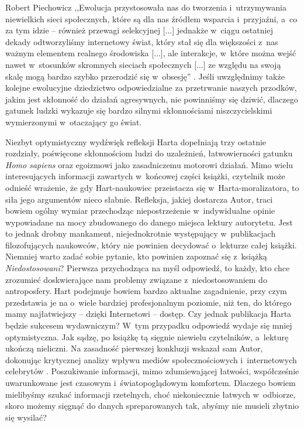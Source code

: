 \begin{newrevplenv}{Robert Piechowicz}
,,Ewolucja przystosowała nas do tworzenia i~utrzymywania niewielkich sieci społecznych, które są dla nas źródłem wsparcia i~przyjaźni, a~co za tym idzie -- również przewagi selekcyjnej [...] jednakże w~ciągu ostatniej dekady odtworzyliśmy internetowy świat, który stał się dla większości z~nas ważnym elementem realnego środowiska [...], ale interakcje, w~które można wejść nawet w~stosunków skromnych sieciach społecznych [...] ze względu na swoją skalę mogą bardzo szybko przerodzić się w~obsesję''
\parencite[][s.~204n]{hart_niedostosowani_2021}. %
 Jeśli uwzględnimy także kolejne ewolucyjne dziedzictwo odpowiedzialne za przetrwanie naszych przodków, jakim jest skłonność do działań agresywnych, nie powinniśmy się dziwić, dlaczego gatunek ludzki wykazuje się bardzo silnymi skłonnościami niszczycielskimi wymierzonymi w~otaczający go świat.

Niezbyt optymistyczny wydźwięk refleksji Harta dopełniają trzy ostatnie rozdziały, poświęcone skłonnościom ludzi do uzależnień, łatwowierności gatunku \textit{Homo sapiens} oraz egoizmowi jako zasadniczemu motorowi działań. Mimo wielu interesujących informacji zawartych w~końcowej części książki, czytelnik może odnieść wrażenie, że gdy Hart-naukowiec przeistacza się w~Harta-moralizatora, to siła jego argumentów nieco słabnie. Refleksja, jakiej dostarcza Autor, traci bowiem ogólny wymiar przechodząc niepostrzeżenie w~indywidualne opinie wypowiadane na mocy zbudowanego do danego miejsca lektury autorytetu. Jest to jednak drobny mankament, niejednokrotnie występujący w~publikacjach filozofujących naukowców, który nie powinien decydować o~lekturze całej książki. Niemniej warto zadać sobie pytanie, kto powinien zapoznać się z~książką \textit{Niedostosowani}? Pierwsza przychodząca na myśl odpowiedź, to każdy, kto chce zrozumieć doskwierające nam problemy związane z~niedostosowaniem do antroposfery. Hart podejmuje bowiem bardzo aktualne zagadnienie, przy czym przedstawia je na o~wiele bardziej profesjonalnym poziomie, niż ten, do którego mamy najłatwiejszy -- dzięki Internetowi -- dostęp. Czy jednak publikacja Harta będzie sukcesem wydawniczym? W~tym przypadku odpowiedź wydaje się mniej optymistyczna. Jak sądzę, po książkę tą sięgnie niewielu czytelników, a~lekturę ukończą nieliczni. Na zasadność pierwszej konkluzji wskazał sam Autor, dokonując krytycznej analizy wpływu mediów społecznościowych i~internetowych celebrytów
\parencite[zob.][s.~179–180]{hart_niedostosowani_2021}. %
 Poszukiwanie informacji, mimo zdumiewającej łatwości, współcześnie uwarunkowane jest czasowym i~światopoglądowym komfortem. Dlaczego bowiem mielibyśmy szukać informacji rzetelnych, choć niekoniecznie łatwych w~odbiorze, skoro możemy sięgnąć do danych spreparowanych tak, abyśmy nie musieli zbytnio się wysilać?


\end{newrevplenv}

